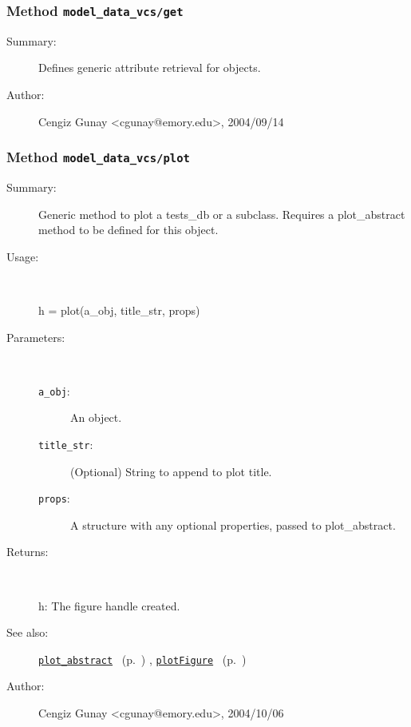 \subsubsection[Method \texttt{get}]{Method \texttt{model\_data\_vcs/get}}%
%
\label{ref_model_data_vcs__get}%
\hypertarget{ref_model_data_vcs__get}{}%
\begin{description}
\item[Summary:]Defines generic attribute retrieval for objects.
%
%
%
%
%
%
%
\item[Author:]%
Cengiz Gunay <cgunay@emory.edu>, 2004/09/14
%
\end{description}
\methodline%
\subsubsection[Method \texttt{plot}]{Method \texttt{model\_data\_vcs/plot}}%
%
\label{ref_model_data_vcs__plot}%
\hypertarget{ref_model_data_vcs__plot}{}%
\begin{description}
\item[Summary:]Generic method to plot a tests\_db or a subclass. Requires a 
	plot\_abstract method to be defined for this object.
%
\item[Usage:]~%
\begin{lyxcode}%
h = plot(a\_obj, title\_str, props)
%
\end{lyxcode}%
%
%
\item[Parameters:]~
\begin{description}%
\item[\texttt{a\_obj}:]
 An object.
\item[\texttt{title\_str}:]
 (Optional) String to append to plot title.
\item[\texttt{props}:]
 A structure with any optional properties, passed to plot\_abstract.
\end{description}%
%
\item[Returns:
]~

	h: The figure handle created.
%
%
\item[See also:]%
\hyperlink{ref_plot_abstract}{\texttt{plot\_abstract}}%
\ (p.~\pageref{ref_plot_abstract})%
%
, \hyperlink{ref_plotFigure}{\texttt{plotFigure}}%
\ (p.~\pageref{ref_plotFigure})%
%
%
\item[Author:]%
Cengiz Gunay <cgunay@emory.edu>, 2004/10/06
%
\end{description}
\methodline%

